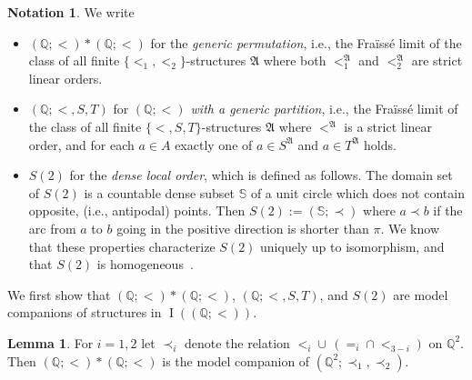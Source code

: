\documentclass{amsart}
\theoremstyle{definition}
\newtheorem{lemma}[theorem]{Lemma}
\newtheorem{notation}[theorem]{Notation}
\theoremstyle{remark}
\numberwithin{equation}{section}
\DeclareMathOperator{\I}{\operatorname{I}}
\newcommand{\fa}{\mathfrak{A}}
\newcommand{\cc}{\mathbb{S}}
\begin{document}
\begin{notation}\label{not:S2}
	We write 
    \begin{itemize}
        \item $(\mathbb{Q};<)*(\mathbb{Q};<)$ for the \emph{generic permutation}, i.e., the Fra\"{i}ss\'{e} limit of the class of all finite $\{<_1,<_2\}$-structures $\fa$ where both $<_1^{\fa}$ and $<_2^{\fa}$ are strict linear orders.
	\item $(\mathbb{Q};<,S,T)$ for \emph{$(\mathbb{Q};<)$ with a generic  partition}, i.e., the Fra\"{i}ss\'{e} limit of the class of all finite $\{<,S,T\}$-structures $\fa$ where $<^{\fa}$ is a strict linear order, and for each $a\in A$ exactly one of $a\in S^{\fa}$ and $a\in T^{\fa}$ holds.
	\item  $S(2)$ for the \emph{dense local order}, which is defined as follows. The domain set of $S(2)$ is a countable dense subset $\cc$ of a unit circle which does not contain opposite, (i.e., antipodal) points. Then $S(2) :=(\cc;\prec)$ where $a\prec b$ if the arc from $a$ to $b$ going in the positive direction is shorter than $\pi$. We know that these properties characterize $S(2)$ uniquely up to isomorphism, and that $S(2)$ is homogeneous~\cite{CameronOrbits,MacphersonSurvey}. 
    \end{itemize}
\end{notation}

	We first show that 
    $({\mathbb Q};<) * ({\mathbb Q}; <)$, $({\mathbb Q};<,S,T)$, and $S(2)$
    are model companions of structures in $\I((\mathbb{Q};<))$.
    


\begin{lemma}\label{companion_perm}
	For $i=1,2$ let $\prec_i$ denote the relation $<_i \cup \, (=_i\cap <_{3-i})$ on $\mathbb{Q}^2$. Then $(\mathbb{Q};<)*(\mathbb{Q};<)$ is the model companion of $(\mathbb{Q}^2;\prec_1,\prec_2)$.
\end{lemma}
\end{document}
